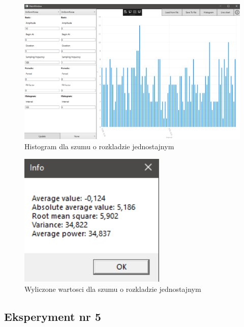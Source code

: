 \documentclass[12pt]{article}
\begin{document}
\begin{figure}[H]
 \centering
 \includegraphics[width=14cm]{images/uni1hist.PNG}
 \vspace{-0.3cm}
 \caption{Histogram dla szumu o rozkladzie jednostajnym}
 \label{gui}
\end{figure}

\begin{figure}[H]
 \centering
 \includegraphics[width=7cm]{images/uni1info.PNG}
 \vspace{-0.3cm}
 \caption{Wyliczone wartosci dla szumu o rozkladzie jednostajnym}
 \label{gui}
\end{figure}



\subsection{Eksperyment nr 5 }
\end{document}
